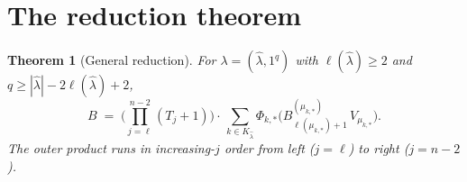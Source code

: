 \documentclass[11pt]{article}
\newtheorem{theorem}{Theorem}
\theoremstyle{definition}
\newcommand{\hatl}{\widehat\lambda}
\newcommand{\elh}{\ell(\hatl)}
\begin{document}
\section{The reduction theorem}\label{sec:reduction}

\begin{theorem}[General reduction]\label{thm:reduction}
For $\lambda = (\hatl, 1^q)$ with $\elh \ge 2$ and $q \ge |\hatl| -
2\elh + 2$,
\begin{equation}\label{eq:reduction}
   B \;=\; \biggl(\prod_{j=\ell}^{n-2}(T_j + 1)\biggr)
   \cdot\,\sum_{k \in K_{\hatl}}
   \Phi_{k,*}\bigl(B^{(\mu_{k,*})}_{\ell(\mu_{k,*})+1}\, V_{\mu_{k,*}}\bigr).
\end{equation}
The outer product runs in increasing-$j$ order from left ($j = \ell$)
to right ($j = n - 2$).
\end{theorem}
\end{document}

